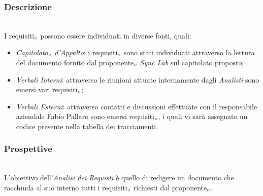 \subsubsection{Descrizione}\label{ProcessiPrimariProspettiveAnalisiDeiRequisitiDescrizione}\mbox{}\\
I requisiti$_{\scaleto{G}{3pt}}$ possono essere individuati in diverse fonti, quali:
\begin{itemize}
	\item \textit{Capitolato$_{\scaleto{G}{3pt}}$ d'Appalto}: i requisiti$_{\scaleto{G}{3pt}}$ sono stati individuati attraverso la lettura del documento fornito dal proponente$_{\scaleto{G}{3pt}}$ \textit{Sync Lab} sul capitolato proposto;
	\item \textit{Verbali Interni}: attraverso le riunioni attuate internamente dagli \textit{Analisti} sono emersi vari requisiti$_{\scaleto{G}{3pt}}$;
	\item \textit{Verbali Esterni}: attraverso contatti e discussioni effettuate con il responsabile aziendale Fabio Pallaro sono emersi requisiti$_{\scaleto{G}{3pt}}$, i quali vi sarà assegnato un codice presente nella tabella dei tracciamenti.
\end{itemize}
\subsubsection{Prospettive}\label{ProcessiPrimariProspettiveAnalisiDeiRequisitiProspettive}\mbox{}\\
L'obiettivo dell'\textit{Analisi dei Requisti} è quello di redigere un documento che racchiuda al suo interno tutti i requisiti$_{\scaleto{G}{3pt}}$ richiesti dal proponente$_{\scaleto{G}{3pt}}$.

